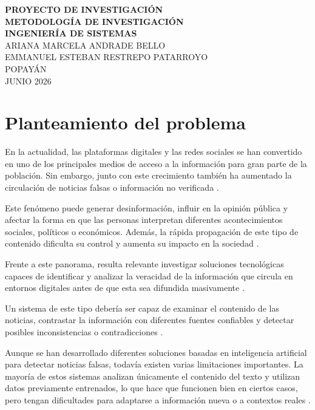\documentclass[12pt]{article}
\begin{document}
\begin{center}
\textbf{\LARGE PROYECTO DE INVESTIGACIÓN} \\[0.5cm]
\textbf{METODOLOGÍA DE INVESTIGACIÓN} \\[0.5cm]
\textbf{INGENIERÍA DE SISTEMAS} \\[1cm]

ARIANA MARCELA ANDRADE BELLO \\
EMMANUEL ESTEBAN RESTREPO PATARROYO \\[1cm]

POPAYÁN \\
JUNIO 2026
\end{center}

\vspace{1cm}

\section{Planteamiento del problema}

En la actualidad, las plataformas digitales y las redes sociales se han convertido en uno de los principales medios de acceso a la información para gran parte de la población. Sin embargo, junto con este crecimiento también ha aumentado la circulación de noticias falsas o información no verificada \cite{shu2017fake}.

Este fenómeno puede generar desinformación, influir en la opinión pública y afectar la forma en que las personas interpretan diferentes acontecimientos sociales, políticos o económicos. Además, la rápida propagación de este tipo de contenido dificulta su control y aumenta su impacto en la sociedad \cite{shu2017fake}. 

Frente a este panorama, resulta relevante investigar soluciones tecnológicas capaces de identificar y analizar la veracidad de la información que circula en entornos digitales antes de que esta sea difundida masivamente \cite{zhou2020survey}. 

Un sistema de este tipo debería ser capaz de examinar el contenido de las noticias, contrastar la información con diferentes fuentes confiables y detectar posibles inconsistencias o contradicciones \cite{castillo2011information}. 

Aunque se han desarrollado diferentes soluciones basadas en inteligencia artificial para detectar noticias falsas, todavía existen varias limitaciones importantes. La mayoría de estos sistemas analizan únicamente el contenido del texto y utilizan datos previamente entrenados, lo que hace que funcionen bien en ciertos casos, pero tengan dificultades para adaptarse a información nueva o a contextos reales \cite{thorne2018automated}.  
\end{document}
